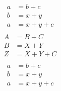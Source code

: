 \begin{align*}
\begin{aligned}
a &= b + c   \\
b &= x + y  \\
a &= x + y + c
\end{aligned}
\end{align*}
\begin{align}
\begin{aligned}
\label{foo}
A &= B + C   \\
B &= X + Y  \\
Z &= X + Y + C
\end{aligned}
\end{align}
\begin{align}
\begin{aligned}
a &= b + c   \\
b &= x + y  \\
a &= x + y + c
\end{aligned}
\end{align}
